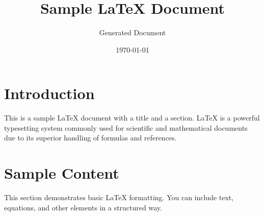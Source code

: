 \documentclass{article}
\title{Sample LaTeX Document}
\author{Generated Document}
\date{\today}
\begin{document}
\maketitle

\section{Introduction}
This is a sample LaTeX document with a title and a section. LaTeX is a powerful typesetting system commonly used for scientific and mathematical documents due to its superior handling of formulas and references.

\section{Sample Content}
This section demonstrates basic LaTeX formatting. You can include text, equations, and other elements in a structured way.
\end{document}
